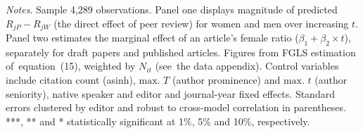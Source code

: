 \begin{table}
\begin{threeparttable}
\begin{tablenotes}
            \item \textit{Notes}. Sample 4,289 observations. Panel one displays magnitude of predicted \(R_{jP}-R_{jW}\) (the direct effect of peer review) for women and men over increasing \(t\). Panel two estimates the marginal effect of an article's female ratio (\(\beta_1+\beta_2\times t\)), separately for draft papers and published articles. Figures from FGLS estimation of~equation~(15), weighted by \(N_{it}\) (see~the data appendix). Control variables include citation count (asinh), \(\text{max. }T\) (author prominence) and \(\text{max. }t\) (author seniority), native speaker and editor and journal-year fixed effects. Standard errors clustered by editor and robust to cross-model correlation in parentheses. ***, ** and * statistically significant at 1\%, 5\% and 10\%, respectively.
        \end{tablenotes}
    \end{threeparttable}
\end{table}
